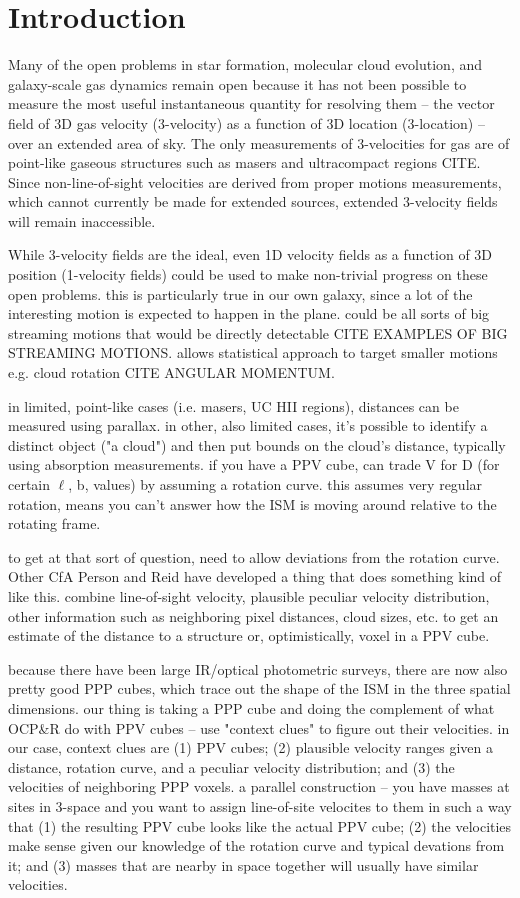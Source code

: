 \section{Introduction}
Many of the open problems in star formation, molecular cloud evolution, and galaxy-scale gas dynamics remain open because it has not been possible to measure the most useful instantaneous quantity for resolving them -- the vector field of 3D gas velocity (3-velocity) as a function of 3D location (3-location) -- over an extended area of sky. 
The only measurements of 3-velocities for gas are of point-like gaseous structures such as masers and ultracompact \HII regions CITE.   
Since non-line-of-sight velocities are derived from proper motions measurements, which cannot currently be made for extended sources, extended 3-velocity fields will remain inaccessible.

While 3-velocity fields are the ideal, even 1D velocity fields as a function of 3D position (1-velocity fields) could be used to make non-trivial progress on these open problems.
this is particularly true in our own galaxy, since a lot of the interesting motion is expected to happen in the plane.
could be all sorts of big streaming motions that would be directly detectable CITE EXAMPLES OF BIG STREAMING MOTIONS.
allows statistical approach to target smaller motions e.g. cloud rotation CITE ANGULAR MOMENTUM.

in limited, point-like cases (i.e. masers, UC HII regions), distances can be measured using parallax.
in other, also limited cases, it's possible to identify a distinct object ("a cloud") and then put bounds on the cloud's distance, typically using absorption measurements. 
if you have a PPV cube, can trade V for D (for certain $\ell$, b, values) by assuming a rotation curve. 
this assumes very regular rotation, means you can't answer how the ISM is moving around relative to the rotating frame.

to get at that sort of question, need to allow deviations from the rotation curve.
Other CfA Person and Reid have developed a thing that does something kind of like this. 
combine line-of-sight velocity, plausible peculiar velocity distribution, other information such as neighboring pixel distances, cloud sizes, etc. to get an estimate of the distance to a structure or, optimistically, voxel in a PPV cube.

because there have been large IR/optical photometric surveys, there are now also pretty good PPP cubes, which trace out the shape of the ISM in the three spatial dimensions. 
our thing is taking a PPP cube and doing the complement of what OCP\&R do with PPV cubes -- use "context clues" to figure out their velocities.
in our case, context clues are (1) PPV cubes; (2) plausible velocity ranges given a distance, rotation curve, and a peculiar velocity distribution; and (3) the velocities of neighboring PPP voxels. 
a parallel construction -- you have masses at sites in 3-space and you want to assign line-of-site velocites to them in such a way that (1) the resulting PPV cube looks like the actual PPV cube; (2) the velocities make sense given our knowledge of the rotation curve and typical devations from it; and (3) masses that are nearby in space together will usually have similar velocities.

